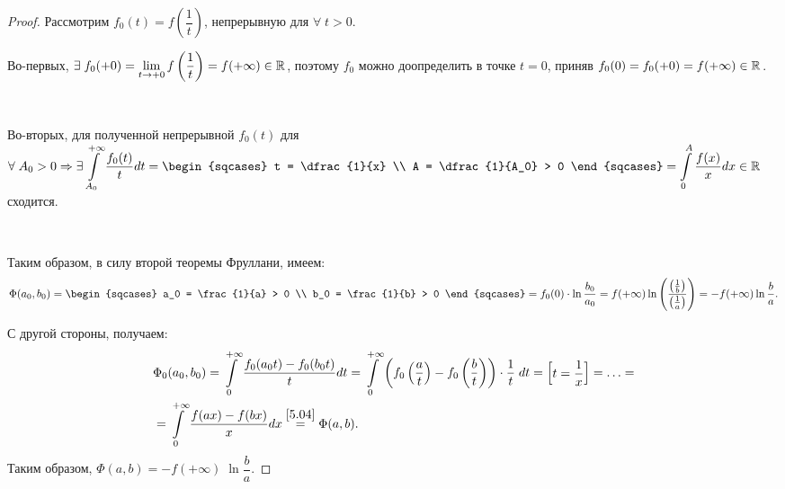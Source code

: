\begin{proof}
	Рассмотрим $ f_0(t) = f\left(\dfrac{1}{t}\right)  $, непрерывную для $ \forall \; t > 0 $.

	Во-первых,
	$ \exists \; f_0(+0) = \lim\limits_{t \to +0} f \left(\dfrac{1}{t}\right) = f (+\infty ) \in \mathbb{R}^{}$,
	поэтому $ f_0 $ можно доопределить в точке $ t = 0 $, приняв \newline
	$ f_0(0) = f_0(+0) = f(+\infty) \in \mathbb{R}^{} $.

	$  $

	Во-вторых, для полученной непрерывной $f_0(t) $ для 
	$ \forall \; A_0 > 0 \Rightarrow \exists \dintl_{A_0}^{+\infty} \dfrac{f_0(t)}{t} dt =
	\begin{sqcases}
	t = \dfrac{1}{x} \\
	A = \dfrac{1}{A_0} > 0
	\end{sqcases}
	=
	\dintl_0^A \dfrac{f(x)}{x} dx \in \R{} $
	сходится.

	$  $

	Таким образом, в силу второй теоремы Фруллани, имеем:
	\begin{equation*}
	\Phi (a_0, b_0)
	= \begin{sqcases}
	a_0 = \frac{1}{a} > 0 \\
	b_0 = \frac{1}{b} > 0
	\end{sqcases}
	= f_0 (0) \cdot \ln \dfrac{b_0}{a_0}
	= f(+\infty) \ln \left(\dfrac{\parenthesis{\frac{1}{b}}}{\parenthesis{\frac{1}{a}}}\right)
	= - f(+\infty) \ln \frac{b}{a}.
	\end{equation*}

	С другой стороны, получаем:
	\begin{align*}
	& \Phi_0 (a_0, b_0)
	= \displaystyle\int\limits_0^{+\infty} \dfrac{f_0(a_0 t)-f_0(b_0 t)}{t} dt
	= \displaystyle\int\limits_0^{+ \infty} \left(f_0 \left(\dfrac{a}{t} \right) - f_0 \left(\dfrac{b}{t} \right) \right) \cdot \dfrac{1}{t} \; dt = \left[\begin{matrix} t = \dfrac{1}{x} \end{matrix}\right]
	= \ldots
	= \\ &
	= \displaystyle\int\limits_0^{+\infty} \dfrac{f(ax)-f(bx)}{x} dx
	\overset{\eqref{5.04}}{=} \Phi (a, b).
	\end{align*}
	Таким образом, $ \Phi (a, b) = - f(+\infty) \; \ln \dfrac{b}{a}. $
\end{proof}

